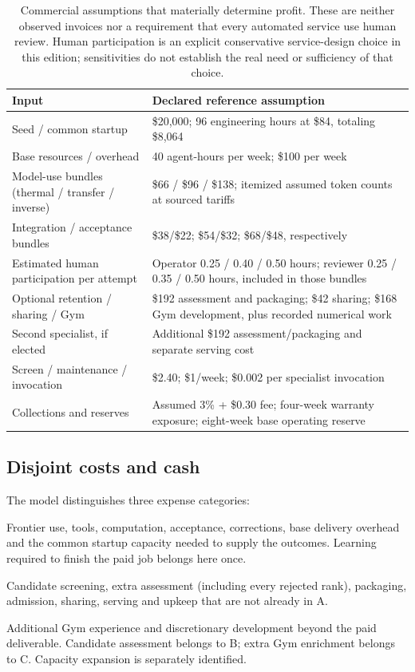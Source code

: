 \documentclass[11pt,letterpaper]{article}
\newcommand{\usd}[1]{\$#1}
\begin{document}
\begin{table}[htbp]\centering\small
\begin{tabular}{p{.42\linewidth}p{.46\linewidth}}
\toprule Input & Declared reference assumption \\
\midrule
Seed / common startup & \usd{20,000}; 96 engineering hours at \usd{84}, totaling \usd{8,064} \\
Base resources / overhead & 40 agent-hours per week; \usd{100} per week \\
Model-use bundles (thermal / transfer / inverse) & \usd{66} / \usd{96} / \usd{138}; itemized assumed token counts at sourced tariffs \\
Integration / acceptance bundles & \usd{38}/\usd{22}; \usd{54}/\usd{32}; \usd{68}/\usd{48}, respectively \\
Estimated human participation per attempt & Operator 0.25 / 0.40 / 0.50 hours; reviewer 0.25 / 0.35 / 0.50 hours, included in those bundles \\
Optional retention / sharing / Gym & \usd{192} assessment and packaging; \usd{42} sharing; \usd{168} Gym development, plus recorded numerical work \\
Second specialist, if elected & Additional \usd{192} assessment/packaging and separate serving cost \\
Screen / maintenance / invocation & \usd{2.40}; \usd{1}/week; \usd{0.002} per specialist invocation \\
Collections and reserves & Assumed 3\% + \usd{0.30} fee; four-week warranty exposure; eight-week base operating reserve \\
\bottomrule
\end{tabular}
\caption{Commercial assumptions that materially determine profit. These are neither observed invoices nor a requirement that every automated service use human review. Human participation is an explicit conservative service-design choice in this edition; sensitivities do not establish the real need or sufficiency of that choice.}
\end{table}

\subsection{Disjoint costs and cash}

The model distinguishes three expense categories:
\begin{description}[font=\normalfont\bfseries]
\item[A: delivery.] Frontier use, tools, computation, acceptance, corrections, base delivery overhead and the common startup capacity needed to supply the outcomes. Learning required to finish the paid job belongs here once.
\item[B: additional retention.] Candidate screening, extra assessment (including every rejected rank), packaging, admission, sharing, serving and upkeep that are not already in A.
\item[C: optional development.] Additional Gym experience and discretionary development beyond the paid deliverable. Candidate assessment belongs to B; extra Gym enrichment belongs to C. Capacity expansion is separately identified.
\end{description}
\end{document}
